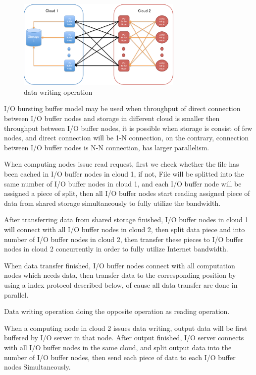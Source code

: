 \documentclass[JIP,draft]{ipsj}
\begin{document}
\begin{figure}[tb]
	\centering
	\includegraphics[width=8cm]{writing}
	\caption{data writing operation}
	\label{writing}
\end{figure}

I/O bursting buffer model may be used when throughput of direct connection between I/O buffer nodes and storage in different cloud is smaller then throughput between I/O buffer nodes, it is possible when storage is consist of few nodes, and direct connection will be 1-N connection, on the contrary, connection between I/O buffer nodes is N-N connection, has larger parallelism.

When computing nodes issue read request, first we check whether the file has been cached in I/O buffer nodes in cloud 1, if not, File will be splitted into the same number of I/O buffer nodes in cloud 1, and each I/O buffer node will be assigned a piece of split, then all I/O buffer nodes start reading assigned piece of data from shared storage simultaneously to fully utilize the bandwidth.%

After transferring data from shared storage finished, I/O buffer nodes in cloud 1 will connect with all I/O buffer nodes in cloud 2, then split data piece and into number of I/O buffer nodes in cloud 2,
then transfer these pieces to I/O buffer nodes in cloud 2 concurrently in order to fully utilize Internet bandwidth.

When data transfer finished, I/O buffer nodes connect with all computation nodes which needs data, then transfer data to the corresponding position by using a index protocol described below, of cause all data transfer are done in parallel.

Data writing operation doing the opposite operation as reading operation.

When a computing node in cloud 2 issues data writing, output data will be first buffered by I/O server in that node.
After output finished, I/O server connects with all I/O buffer nodes in the same cloud, and split output data into the number of I/O buffer nodes, then send each piece of data to each I/O buffer nodes Simultaneously.
\end{document}
